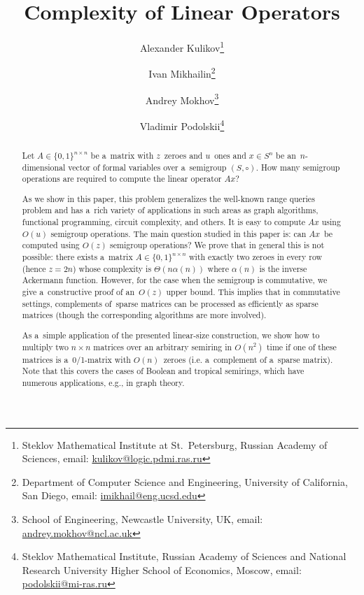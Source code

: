 \documentclass[11pt,letterpaper]{article}
\begin{document}

\sloppy
\author{
Alexander Kulikov\thanks{Steklov Mathematical Institute at St.~Petersburg, Russian Academy of Sciences, email: \href{mailto:kulikov@logic.pdmi.ras.ru}{kulikov@logic.pdmi.ras.ru}}
\and
Ivan Mikhailin\thanks{Department of Computer Science and Engineering, University
of California, San Diego, email: \href{mailto:imikhail@eng.ucsd.edu}{imikhail@eng.ucsd.edu}} \and
Andrey Mokhov\thanks{School of Engineering, Newcastle University, UK, email: \href{mailto:andrey.mokhov@ncl.ac.uk}{andrey.mokhov@ncl.ac.uk}}
\and
Vladimir Podolskii\thanks{Steklov Mathematical Institute, Russian Academy of Sciences and
National Research University Higher School of Economics, Moscow, email: \href{mailto:podolskii@mi-ras.ru}{podolskii@mi-ras.ru}}}
\date{}
\title{Complexity of Linear Operators}
\maketitle

\begin{abstract}
Let $A \in \{0,1\}^{n \times n}$ be a~matrix with $z$~zeroes
and $u$~ones and $x \in S^n$ be an~$n$-dimensional vector of
formal variables over a~semigroup $(S, \circ)$.
How many semigroup operations are required to compute the linear operator $Ax$?

As we show in this paper, this problem generalizes the well-known
range queries problem and has a~rich variety of applications in
such areas as graph algorithms, functional programming, circuit complexity,
and others. It is easy to compute $Ax$ using $O(u)$ semigroup
operations.
The main question studied in this paper is:
can $Ax$~be computed using $O(z)$ semigroup operations?
We prove that in general this is not possible: there exists
a~matrix $A \in \{0,1\}^{n \times n}$ with exactly two zeroes in every row
(hence $z=2n$) whose complexity is $\Theta(n\alpha(n))$
where $\alpha(n)$ is the inverse Ackermann function.
However, for the case when the semigroup is commutative,
we give a~constructive proof of an~$O(z)$ upper bound.
This implies that in commutative settings, complements of~sparse 
matrices can
be processed as efficiently as sparse matrices (though the 
corresponding
algorithms are more involved).

As a~simple application of the presented linear-size construction, 
we show
how to multiply two $n\times n$ matrices over an arbitrary 
semiring in $O(n^2)$
time if one of these matrices is a~0/1-matrix with $O(n)$~zeroes 
(i.e. a~complement of a~sparse matrix). Note that this covers the 
cases of Boolean and tropical semirings, which have numerous 
applications, e.g., in graph theory.
\end{abstract}
\end{document}
